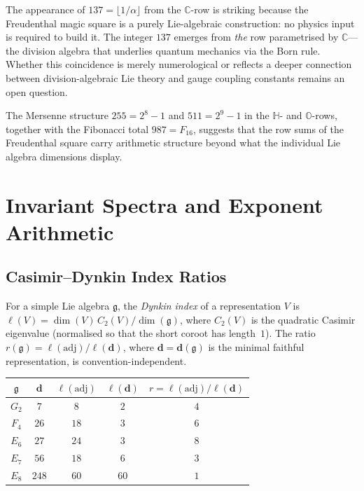 \documentclass[11pt]{amsart}
\theoremstyle{plain}
\theoremstyle{definition}
\theoremstyle{remark}
\begin{document}
The appearance of $137 = \lfloor 1/\alpha \rfloor$ from the
$\mathbb{C}$-row is striking because the Freudenthal magic square is
a purely Lie-algebraic construction: no physics input is required to
build it.  The integer $137$ emerges from \emph{the} row parametrised by
$\mathbb{C}$---the division algebra that underlies quantum mechanics via
the Born rule.  Whether this coincidence is merely numerological or
reflects a deeper connection between division-algebraic Lie theory and
gauge coupling constants remains an open question.

The Mersenne structure $255 = 2^8 - 1$ and $511 = 2^9 - 1$ in the
$\mathbb{H}$- and $\mathbb{O}$-rows, together with the Fibonacci total
$987 = F_{16}$, suggests that the row sums of the Freudenthal square
carry arithmetic structure beyond what the individual Lie algebra
dimensions display.

\section{Invariant Spectra and Exponent Arithmetic}\label{sec:invariant-spectra}

\subsection{Casimir--Dynkin Index Ratios}

For a simple Lie algebra $\mathfrak{g}$, the \emph{Dynkin index} of a
representation $V$ is $\ell(V) = \dim(V)\,C_2(V)/\dim(\mathfrak{g})$,
where $C_2(V)$ is the quadratic Casimir eigenvalue (normalised so that
the short coroot has length~$1$).  The ratio
$r(\mathfrak{g}) = \ell(\mathrm{adj})/\ell(\mathbf{d})$, where
$\mathbf{d} = \mathbf{d}(\mathfrak{g})$ is the minimal faithful representation,
is convention-independent.

\begin{center}
\begin{tabular}{ccccc}
\toprule
$\mathfrak{g}$ & $\mathbf{d}$ & $\ell(\mathrm{adj})$ & $\ell(\mathbf{d})$
  & $r = \ell(\mathrm{adj})/\ell(\mathbf{d})$ \\
\midrule
$G_2$ & $7$   & $8$  & $2$  & $4$ \\
$F_4$ & $26$  & $18$ & $3$  & $6$ \\
$E_6$ & $27$  & $24$ & $3$  & $8$ \\
$E_7$ & $56$  & $18$ & $6$  & $3$ \\
$E_8$ & $248$ & $60$ & $60$ & $1$ \\
\bottomrule
\end{tabular}
\end{center}
\end{document}
